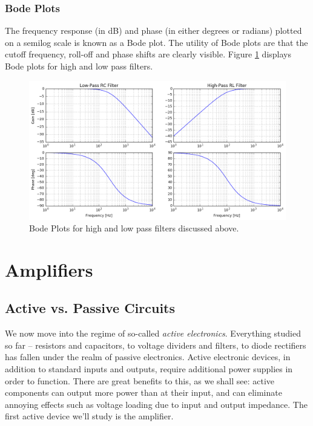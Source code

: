 \documentclass{tufte-book}
\begin{document}
\subsection{Bode Plots}
The frequency response (in dB) and phase (in either degrees or radians) plotted on a semilog scale is known as a Bode plot. The utility of Bode plots are that the cutoff frequency, roll-off and phase shifts are clearly visible. Figure \ref{fig:bode_filts} displays Bode plots for high and low pass filters.


\begin{figure}[h]
\caption{Bode Plots for high and low pass filters discussed above.}
\label{fig:bode_filts}
\begin{center}
\includegraphics[width=\textwidth]{bode_filts.png}
\end{center}
\end{figure}


\chapter{Amplifiers}
\section{Active vs. Passive Circuits}
We now move into the regime of so-called \textit{active electronics}. Everything studied so far -- resistors and capacitors, to voltage dividers and filters, to diode rectifiers has fallen under the realm of passive electronics. Active electronic devices, in addition to standard inputs and outputs, require additional power supplies in order to function. There are great benefits to this, as we shall see: active components can output more power than at their input, and can eliminate annoying effects such as voltage loading due to input and output impedance. The first active device we'll study is the amplifier.
\end{document}
